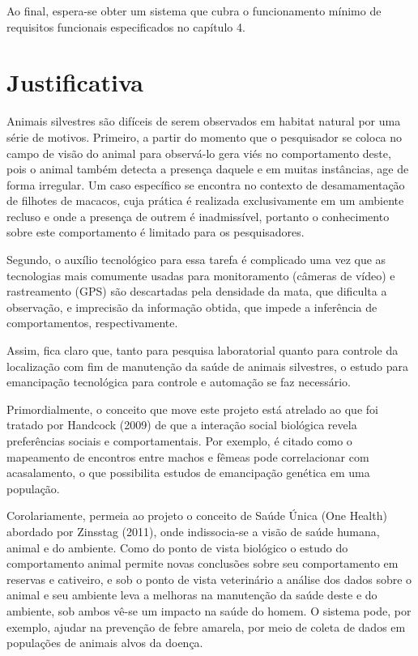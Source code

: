 Ao final, espera-se obter um sistema que cubra o funcionamento mínimo de requisitos funcionais especificados no capítulo 4.

\section{Justificativa}
Animais silvestres são difíceis de serem observados em habitat natural por uma série de motivos. Primeiro, a partir do momento que o pesquisador se coloca no campo de visão do animal para observá-lo gera viés no comportamento deste, pois o animal também detecta a presença daquele e em muitas instâncias, age de forma irregular. Um caso específico se encontra no contexto de desamamentação de filhotes de macacos, cuja prática é realizada exclusivamente em um ambiente recluso e onde a presença de outrem é inadmissível, portanto o conhecimento sobre este comportamento é limitado para os pesquisadores.

Segundo, o auxílio tecnológico para essa tarefa é complicado uma vez que as tecnologias mais comumente usadas para monitoramento (câmeras de vídeo)  e rastreamento (GPS) são descartadas pela densidade da mata, que dificulta a observação, e imprecisão da informação obtida, que impede a inferência de comportamentos, respectivamente.

Assim, fica claro que, tanto para pesquisa laboratorial quanto para controle da localização com fim de manutenção da saúde de animais silvestres, o estudo para emancipação tecnológica para controle e automação se faz necessário.

Primordialmente, o conceito que move este projeto está atrelado ao que foi tratado por Handcock (2009) de que a interação social biológica revela preferências sociais e comportamentais. Por exemplo, é citado como o mapeamento de encontros entre machos e fêmeas pode correlacionar com acasalamento, o que possibilita estudos de emancipação genética em uma população.

Corolariamente, permeia ao projeto o conceito de Saúde Única (One Health) abordado por Zinsstag (2011), onde indissocia-se a visão de saúde humana, animal e do ambiente. Como do ponto de vista biológico o estudo do comportamento animal permite novas conclusões sobre seu comportamento em reservas e cativeiro, e sob o ponto de vista veterinário a análise dos dados sobre o animal e seu ambiente leva a melhoras na manutenção da saúde deste e do ambiente, sob ambos vê-se um impacto na saúde do homem. O sistema pode, por exemplo, ajudar na prevenção de febre amarela, por meio de coleta de dados em populações de animais alvos da doença.

